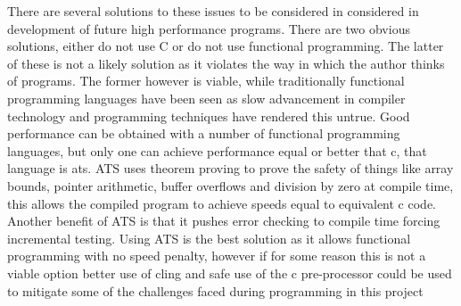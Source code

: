 \documentclass{article}
\begin{document}
There are several solutions to these issues to be considered in considered in
development of future high performance programs. There are two obvious
solutions, either do not use C or do not use functional programming. The latter
of these is not a likely solution as it violates the way in which the author
thinks of programs. The former however is viable, while traditionally functional
programming languages have been seen as slow advancement in compiler technology
and programming techniques have rendered this untrue. Good performance can be
obtained with a number of functional programming languages, but only one can
achieve performance equal or better that c, that language is ats. ATS uses
theorem proving to prove the safety of things like array bounds, pointer
arithmetic, buffer overflows and division by zero at compile time, this allows
the compiled program to achieve speeds equal to equivalent c code. Another
benefit of ATS is that it pushes error checking to compile time forcing
incremental testing. Using ATS is the best solution as it allows functional
programming with no speed penalty, however if for some reason this is not a
viable option better use of cling and safe use of the c pre-processor could be
used to mitigate some of the challenges faced during programming in this
project
\end{document}
